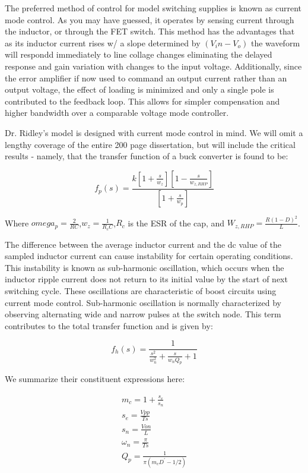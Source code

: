 The preferred method of control for model switching supplies is known as current mode control. As you may have guessed, it operates by sensing current through the inductor, or through the FET switch. This method has the advantages that as its inductor current rises w/ a slope determined by $(V_in-V_o)$ the waveform will respondd immediately to line collage changes eliminating the delayed response and gain variation with changes to the input voltage. Additionally, since the error amplifier if now used to command an output current rather than an output voltage, the effect of loading is minimized and only a single pole is contributed to the feedback loop. This allows for simpler compensation and higher bandwidth over a comparable voltage mode controller. 

Dr. Ridley's model is designed with current mode control in mind. We will omit a lengthy coverage of the entire 200 page dissertation, but will include the critical results - namely, that the transfer function of a buck converter is found to be:

\begin{equation}
f_p(s)=\frac{k[1 + \frac{s}{w_z}][1 - \frac{s}{w_{z,RHP}}]}{[1 + \frac{s}{w_p}]}
\end{equation}

Where $omega_p = \frac{2}{RC}$,$w_z = \frac{1}{R_cC}$,$R_c$ is the ESR of the cap, and $W_{z,RHP} = \frac{R(1-D)^2}{L}$.

The difference between the average inductor current and the dc value of the sampled inductor current can cause instability for certain operating conditions. This instability is known as sub-harmonic oscillation, which occurs when the inductor ripple current does not return to its initial value by the start of next switching cycle. These oscillations are characteristic of boost circuits using current mode control. Sub-harmonic oscillation is normally characterized by observing alternating wide and narrow pulses at the switch node. This term contributes to the total transfer function and is given by:

\begin{equation}
f_h(s)=\frac{1}{\frac{s^2}{w_n^2} + \frac{s}{w_nQ_p} + 1}
\end{equation}

We summarize their constituent expressions here:

\begin{gather*}
m_c = 1 + \frac{s_e}{s_n} \\
s_e = \frac{Vpp}{Ts} \\
s_n = \frac{Von}{L} \\
\omega_n = \frac{\pi}{Ts}\\
Q_p = \frac{1}{\pi(m_cD^{'}-1/2)}
\end{gather*}

